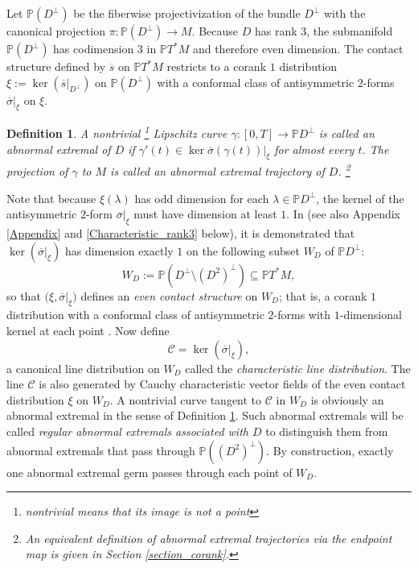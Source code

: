 \documentclass[11pt,letterpaper]{amsart}
\newtheorem{definition}[theorem]{Definition}
\numberwithin{equation}{section}
\newcommand{\oline}{\overline}
\begin{document}
Let $\mathbb P(D^\perp)$ be the fiberwise projectivization of the bundle $D^\perp$ with the canonical projection $\pi: \mathbb P (D^\perp)\to M$. Because $D$ has rank $3$, the submanifold $\mathbb P (D^\perp)$ has codimension $3$ in $\mathbb{P}T^*M$ and therefore even dimension. The contact structure defined by $\oline{s}$ on $\mathbb PT^*M$ restricts to a corank $1$ distribution $\xi := \ker(\oline {s}|_{D^\perp})$ on $\mathbb P (D^\perp)$ 
with a conformal class of antisymmetric $2$-forms $\oline{\sigma}|_\xi$ on $\xi$. 
\begin{definition}
\label{abnorm_def}
A nontrivial \footnote{nontrivial means that its image is not a point} Lipschitz curve $\gamma:[0, T]\to \mathbb P D^\perp$ is called an \emph{abnormal extremal} of $D$ if $\gamma'(t)\in \ker \oline\sigma(\gamma(t))|_{\xi}$ for almost every $t$. The projection of $\gamma$ to $M$ is called an \emph{abnormal extremal trajectory} of $D$. \footnote{An equivalent definition of abnormal extremal trajectories via the endpoint map is given in Section \ref{section_corank}.}
\end{definition}
Note that because $\xi(\lambda)$ has odd dimension for each $\lambda\in \mathbb PD^\perp$, the kernel of the antisymmetric $2$-form $\oline{\sigma}|_{\xi}$ must have dimension at least $1$. In \cite{doubrov2008rank3} (see also Appendix \ref{Appendix} and \eqref{Characteristic_rank3} below), it is demonstrated that $\ker(\oline{\sigma}|_{\xi})$ has dimension exactly $1$ on the following subset $W_D$ of $\mathbb P D^\perp$:
\begin{equation}
    W_D:=\mathbb{P}\left(D^\perp\setminus\left(D^2 \right)^\perp\right)\subseteq \mathbb{P}T^*M,
\end{equation}
so that 
$\big(\xi,\oline{\sigma}|_\xi\big)$ defines an \emph{even contact structure} on $W_D$; that is, a corank $1$ distribution with a conformal class of antisymmetric $2$-forms with $1$-dimensional kernel at each point \cite[\S 1.1, \S2.1]{doubrov2008rank3}. Now define
\begin{equation}
    \mathcal C = \ker(\oline{\sigma}|_{\xi}),
\end{equation}
a canonical line distribution on $W_D$ called the \emph{characteristic line distribution}. The line $\mathcal{C}$ is also generated by Cauchy characteristic vector fields of the even contact distribution $\xi$ on $W_D$. A nontrivial curve tangent to $\mathcal{C}$ in $W_D$ is obviously an abnormal extremal in the sense of Definition \ref{abnorm_def}. Such abnormal extremals will be called \emph{regular abnormal extremals associated with $D$} to distinguish them from abnormal extremals that pass through $\mathbb P((D^2)^\perp)$. By construction, exactly one abnormal extremal germ passes through each point of $W_D$.
\end{document}
